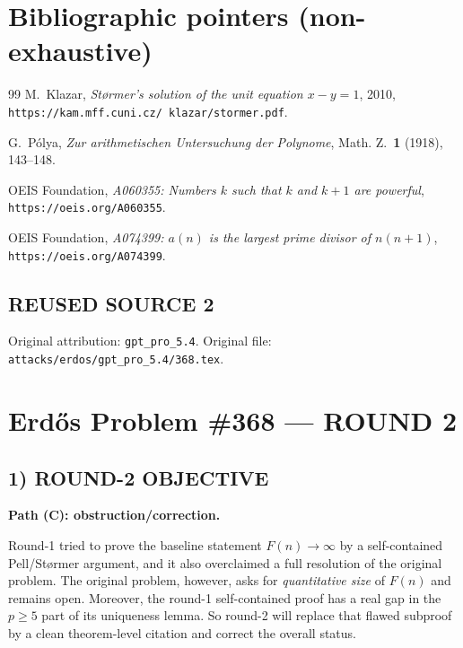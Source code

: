 \section*{Bibliographic pointers (non-exhaustive)}
\begin{thebibliography}{99}
M.~Klazar, \emph{St\o rmer's solution of the unit equation $x-y=1$}, 2010,\newline
\texttt{https://kam.mff.cuni.cz/~klazar/stormer.pdf}.

G.~P\'olya, \emph{Zur arithmetischen Untersuchung der Polynome}, Math. Z.\ \textbf{1} (1918), 143--148.

OEIS Foundation, \emph{A060355: Numbers $k$ such that $k$ and $k+1$ are powerful},\newline
\texttt{https://oeis.org/A060355}.

OEIS Foundation, \emph{A074399: $a(n)$ is the largest prime divisor of $n(n+1)$},\newline
\texttt{https://oeis.org/A074399}.
\end{thebibliography}



\subsection*{REUSED SOURCE 2}
Original attribution: \texttt{gpt\_pro\_5.4}.
Original file: \texttt{attacks/erdos/gpt\_pro\_5.4/368.tex}.

\section*{Erd\H{o}s Problem \#368 --- ROUND 2}

\subsection*{1) ROUND-2 OBJECTIVE}
\textbf{Path (C): obstruction/correction.}

Round-1 tried to prove the baseline statement $F(n)\to\infty$ by a self-contained Pell/St\o rmer argument, and it also overclaimed a full resolution of the original problem. The original problem, however, asks for \emph{quantitative size} of $F(n)$ and remains open. Moreover, the round-1 self-contained proof has a real gap in the $p\ge 5$ part of its uniqueness lemma. So round-2 will replace that flawed subproof by a clean theorem-level citation and correct the overall status.

